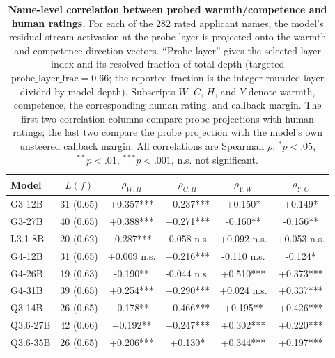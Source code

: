 \begin{table}[H]
\centering
\scriptsize
\setlength{\tabcolsep}{1.4pt}
\begin{tabular}{@{}lccccc@{}}
\toprule
Model & $L(f)$ & $\rho_{W,H}$ & $\rho_{C,H}$ & $\rho_{Y,W}$ & $\rho_{Y,C}$ \\
\midrule
G3-12B & 31 (0.65) & +0.357*** & +0.237*** & +0.150* & +0.149* \\
G3-27B & 40 (0.65) & +0.388*** & +0.271*** & -0.160** & -0.156** \\
L3.1-8B & 20 (0.62) & -0.287*** & -0.058 n.s. & +0.092 n.s. & +0.053 n.s. \\
G4-12B & 31 (0.65) & +0.009 n.s. & +0.216*** & -0.110 n.s. & -0.124* \\
G4-26B & 19 (0.63) & -0.190** & -0.044 n.s. & +0.510*** & +0.373*** \\
G4-31B & 39 (0.65) & +0.254*** & +0.290*** & +0.024 n.s. & +0.337*** \\
Q3-14B & 26 (0.65) & -0.178** & +0.466*** & +0.195** & +0.426*** \\
Q3.6-27B & 42 (0.66) & +0.192** & +0.247*** & +0.302*** & +0.220*** \\
Q3.6-35B & 26 (0.65) & +0.206*** & +0.130* & +0.344*** & +0.197*** \\
\bottomrule
\end{tabular}
\caption{\textbf{Name-level correlation between probed warmth/competence and human ratings.} For each of the 282 rated applicant names, the model's residual-stream activation at the probe layer is projected onto the warmth and competence direction vectors. ``Probe layer'' gives the selected layer index and its resolved fraction of total depth (targeted $\mathrm{probe\_layer\_frac}=0.66$; the reported fraction is the integer-rounded layer divided by model depth). Subscripts $W$, $C$, $H$, and $Y$ denote warmth, competence, the corresponding human rating, and callback margin. The first two correlation columns compare probe projections with human ratings; the last two compare the probe projection with the model's own unsteered callback margin. All correlations are Spearman $\rho$. $^{*}p<.05$, $^{**}p<.01$, $^{***}p<.001$, n.s. not significant.}
\label{tab:probe_human}
\end{table}
